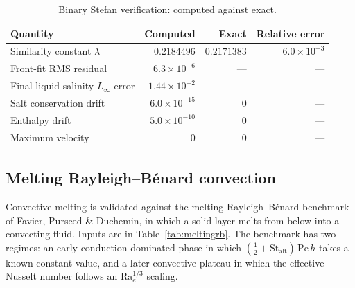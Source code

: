 \documentclass[review,12pt]{elsarticle}
\newcommand{\Ra}{\mathrm{Ra}}
\newcommand{\St}{\mathrm{St}}
\begin{document}
\begin{table}[H]
\centering
\caption{Binary Stefan verification: computed against exact.}
\label{tab:stefan-results}
\begin{tabular}{l r r r}
\toprule
Quantity & Computed & Exact & Relative error \\
\midrule
Similarity constant $\lambda$ & $0.2184496$ & $0.2171383$ & $6.0\times10^{-3}$ \\
Front-fit RMS residual & $6.3\times10^{-6}$ & --- & --- \\
Final liquid-salinity $L_\infty$ error & $1.44\times10^{-2}$ & --- & --- \\
Salt conservation drift & $6.0\times10^{-15}$ & $0$ & --- \\
Enthalpy drift & $5.0\times10^{-10}$ & $0$ & --- \\
Maximum velocity & $0$ & $0$ & --- \\
\bottomrule
\end{tabular}
\end{table}

\subsection{Melting Rayleigh--B\'enard convection}
\label{sec:meltingrb}

Convective melting is validated against the melting Rayleigh--B\'enard benchmark
of Favier, Purseed \& Duchemin, in which a solid layer melts from below into a
convecting fluid. Inputs are in Table~\ref{tab:meltingrb}. The benchmark has two
regimes: an early conduction-dominated phase in which
$(\tfrac12+\St_{\mathrm{alt}})\,\mathrm{Pe}\,\dot h$ takes a known constant
value, and a later convective plateau in which the effective Nusselt number
follows an $\Ra_e^{1/3}$ scaling.
\end{document}
